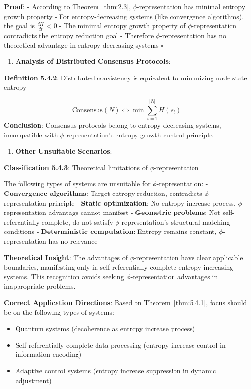    \textbf{Proof}:
   - According to Theorem~\ref{thm:2.3}, $\phi$-representation has minimal entropy growth property
   - For entropy-decreasing systems (like convergence algorithms), the goal is $\frac{dH}{dt} < 0$
   - The minimal entropy growth property of $\phi$-representation contradicts the entropy reduction goal
   - Therefore $\phi$-representation has no theoretical advantage in entropy-decreasing systems $\square$

\begin{enumerate}
\item \textbf{Analysis of Distributed Consensus Protocols}:
\end{enumerate}
   \textbf{Definition 5.4.2}: Distributed consistency is equivalent to minimizing node state entropy
\label{def:5.4.2}
   
\begin{equation}
\text{Consensus}(N) \Leftrightarrow \min \sum_{i=1}^{|N|} H(s_i)
\end{equation}
   \textbf{Conclusion}: Consensus protocols belong to entropy-decreasing systems, incompatible with $\phi$-representation's entropy growth control principle.

\begin{enumerate}
\item \textbf{Other Unsuitable Scenarios}:
\end{enumerate}
   \textbf{Classification 5.4.3}: Theoretical limitations of $\phi$-representation
   
   The following types of systems are unsuitable for $\phi$-representation:
   - \textbf{Convergence algorithms}: Target entropy reduction, contradicts $\phi$-representation principle
   - \textbf{Static optimization}: No entropy increase process, $\phi$-representation advantage cannot manifest
   - \textbf{Geometric problems}: Not self-referentially complete, do not satisfy $\phi$-representation's structural matching conditions
   - \textbf{Deterministic computation}: Entropy remains constant, $\phi$-representation has no relevance

\textbf{Theoretical Insight}:
The advantages of $\phi$-representation have clear applicable boundaries, manifesting only in self-referentially complete entropy-increasing systems. This recognition avoids seeking $\phi$-representation advantages in inappropriate problems.

\textbf{Correct Application Directions}:
Based on Theorem~\ref{thm:5.4.1}, focus should be on the following types of systems:
\begin{itemize}
\item Quantum systems (decoherence as entropy increase process)
\item Self-referentially complete data processing (entropy increase control in information encoding)
\item Adaptive control systems (entropy increase suppression in dynamic adjustment)
\end{itemize}

